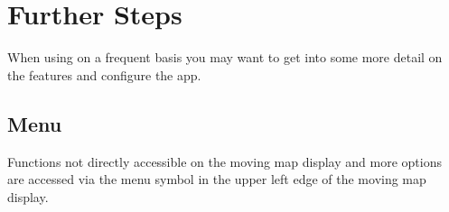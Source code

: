 \documentclass[letterpaper,10pt,english]{sphinxmanual}
\begin{document}
\chapter{Further Steps}
\label{\detokenize{01-intro/further_steps:further-steps}}\label{\detokenize{01-intro/further_steps::doc}}
\sphinxAtStartPar
When using  on a frequent basis you may want to get
into some more detail on the features and configure the app.


\section{Menu}
\label{\detokenize{01-intro/further_steps:menu}}
\sphinxAtStartPar
Functions not directly accessible on the moving map display and more options are accessed via the menu symbol in the upper left edge of the moving map display.
\end{document}
